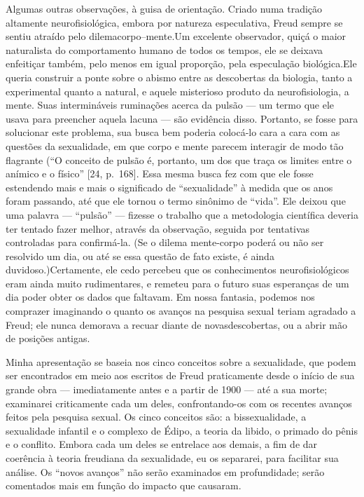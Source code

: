  Algumas outras observações, à guisa de orientação. Criado numa tradição
altamente neurofisiológica, embora por natureza especulativa, Freud
sempre se sentiu atraído pelo dilema\idxquest[|(] corpo--mente.\idxfreudmente[|(] Um excelente
observador, quiçá o maior naturalista do comportamento humano de todos
os tempos, ele se deixava enfeitiçar também, pelo menos em igual
proporção, pela especulação biológica.\idxfreudbiolo[|(] Ele queria construir a ponte
sobre o abismo entre as descobertas da biologia, tanto a experimental
quanto a natural, e aquele misterioso produto da neurofisiologia, a
mente. Suas intermináveis ruminações acerca da pulsão --- um termo que
ele usava para preencher aquela lacuna --- são evidência disso.
Portanto, se fosse para solucionar este problema, sua busca bem
poderia colocá-lo cara a cara com as questões da sexualidade, em que
corpo e mente parecem interagir de modo tão flagrante (``O
conceito de pulsão é, portanto, um dos que traça os limites entre o
anímico e o físico'' [24, p.~168]. Essa mesma busca fez
com que ele fosse estendendo mais e mais o significado de
``sexualidade'' à medida que os anos foram
passando, até que ele tornou o termo sinônimo de
``vida''. Ele deixou que uma palavra ---
``pulsão'' --- fizesse o trabalho que a
metodologia científica deveria ter tentado fazer melhor, através da
observação, seguida por tentativas controladas para confirmá-la. (Se o
dilema mente-corpo poderá ou não ser resolvido um dia, ou até se essa
questão de fato existe, é ainda duvidoso.)\idxfreudmente[|)] Certamente, ele cedo
percebeu que os conhecimentos neurofisiológicos eram ainda muito
rudimentares, e remeteu para o futuro suas esperanças de um dia poder
obter os dados que faltavam. Em nossa fantasia, podemos nos comprazer
imaginando o quanto os avanços na pesquisa sexual teriam agradado a
Freud; ele nunca demorava a recuar diante de novas\idxquest[|)] descobertas, ou a
abrir mão de posições antigas.

 Minha apresentação se baseia nos cinco conceitos sobre a sexualidade,
que podem ser encontrados em meio aos escritos de Freud praticamente
desde o início de sua grande obra --- imediatamente antes e a partir de
1900 --- até a sua morte; examinarei criticamente cada um deles,
confrontando-os com os recentes avanços feitos pela pesquisa sexual. Os
cinco conceitos são: a bissexualidade,\idxbisse{} a\idxsexui{} sexualidade infantil\idxinfansexua{} e o
complexo de Édipo,\idxconfe{} a teoria da libido,\idxlibid{} o primado\idxpenisprim{} do pênis e o conflito.\idxconf{}
Embora cada um deles se entrelace aos demais, a fim de dar coerência à
teoria freudiana da sexualidade, eu os separarei, para facilitar sua
análise. Os ``novos avanços'' não serão
examinados em profundidade; serão comentados mais em função do impacto
que causaram.


